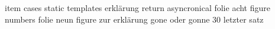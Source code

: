 item cases
static templates erklärung
return asyncronical
folie acht figure numbers
folie neun figure zur erklärung
gone oder gonne
30 letzter satz
